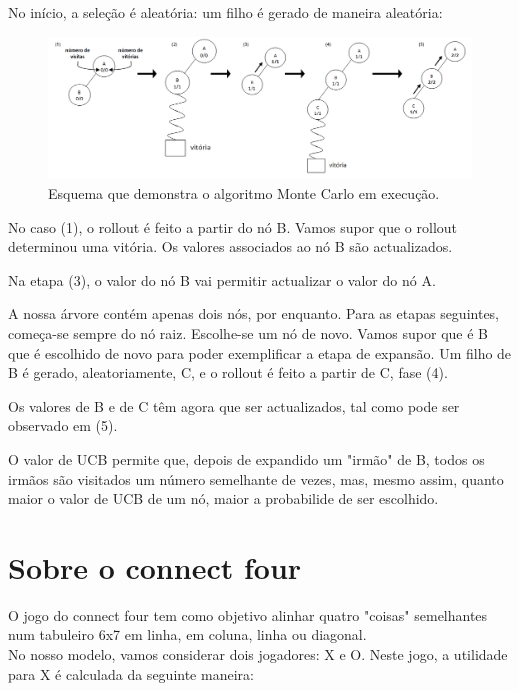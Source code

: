 \documentclass{article}
\begin{document}
No início, a seleção é aleatória: um filho é gerado de maneira aleatória:
\begin{figure}[H]
\begin{center} \includegraphics[scale=0.55]{figure4.png}
\caption{Esquema que demonstra o algoritmo Monte Carlo em execução.}
\end{center}
\end{figure}

No caso (1), o rollout é feito a partir do nó B. Vamos supor que o rollout determinou uma vitória. Os valores associados ao nó B são actualizados.


Na etapa (3), o valor do nó B vai permitir actualizar o valor do nó A.


A nossa árvore contém apenas dois nós, por enquanto. Para as etapas seguintes, começa-se sempre do nó raiz. Escolhe-se um nó de novo. Vamos supor que é B que é escolhido de novo para poder exemplificar a etapa de expansão. Um filho de B é gerado, aleatoriamente, C, e o rollout é feito a partir de C, fase (4).


Os valores de B e de C têm agora que ser actualizados, tal como pode ser observado em (5).


O valor de UCB permite que, depois de expandido um "irmão" de B, todos os irmãos são visitados um número semelhante de vezes, mas, mesmo assim, quanto maior o valor de UCB de um nó, maior a probabilide de ser escolhido.


\section{Sobre o connect four}
\hspace{10mm} O jogo do connect four tem como objetivo alinhar quatro "coisas" semelhantes num tabuleiro 6x7 em linha, em coluna, linha ou diagonal. \\
No nosso modelo, vamos considerar dois jogadores: X e O.
Neste jogo, a utilidade para X é calculada da seguinte maneira:
\end{document}
